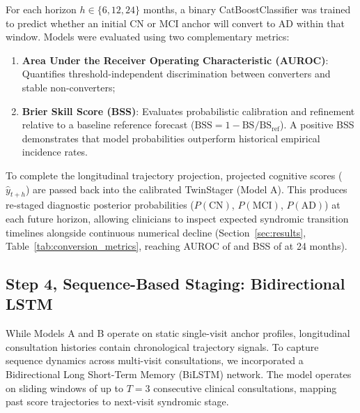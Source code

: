 For each horizon $h \in \{6, 12, 24\}$ months, a binary CatBoostClassifier was trained to predict whether an initial CN or MCI anchor will convert to AD within that window. Models were evaluated using two complementary metrics:
\begin{enumerate}
    \item \textbf{Area Under the Receiver Operating Characteristic (AUROC)}: Quantifies threshold-independent discrimination between converters and stable non-converters;
    \item \textbf{Brier Skill Score (BSS)}: Evaluates probabilistic calibration and refinement relative to a baseline reference forecast ($\text{BSS} = 1 - \text{BS} / \text{BS}_{\text{ref}}$). A positive BSS demonstrates that model probabilities outperform historical empirical incidence rates.
\end{enumerate}

To complete the longitudinal trajectory projection, projected cognitive scores ($\hat{y}_{t+h}$) are passed back into the calibrated TwinStager (Model A). This produces re-staged diagnostic posterior probabilities ($P(\text{CN})$, $P(\text{MCI})$, $P(\text{AD})$) at each future horizon, allowing clinicians to inspect expected syndromic transition timelines alongside continuous numerical decline (Section~\ref{sec:results}, Table~\ref{tab:conversion_metrics}, reaching AUROC of \ConvAUCXXIV{} and BSS of \ConvBSSXXIV{} at 24 months).

\subsection{Step 4, Sequence-Based Staging: Bidirectional LSTM}
While Models A and B operate on static single-visit anchor profiles, longitudinal consultation histories contain chronological trajectory signals. To capture sequence dynamics across multi-visit consultations, we incorporated a Bidirectional Long Short-Term Memory (BiLSTM) network. The model operates on sliding windows of up to $T = 3$ consecutive clinical consultations, mapping past score trajectories to next-visit syndromic stage.

